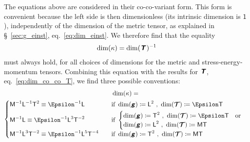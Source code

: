 \documentclass[\ifafour a4paper,12pt,\else a5paper,10pt,\fi%
onecolumn,oneside,article,%
british%
]{memoir}
\makeatletter
\theoremstyle{remark}
\theoremstyle{innote}
\newcommand*{\mathte}[1]{\textbf{\textit{\textsf{#1}}}}
\newcommand*{\defd}{\coloneqq}
\renewcommand*{\|}[1][]{\nonscript\,#1\vert\nonscript\;\mathopen{}}
\newcommand*{\sect}{\S}%
\newcommand*{\eqn}{eq.}%
\newcommand*{\q}{}%
\DeclareRobustCommand*{\q}{%
  \mathord{\mathpalette\bigcdot@{}}%
}
\newcommand*{\bigcdot@scalefactor}{0.7}
\newcommand*{\bigcdot@widthfactor}{1.5}
\newcommand*{\bigcdot@}[2]{%
  \sbox0{$#1\vcenter{}$}%
  \sbox2{$#1\cdot\m@th$}%
  \hbox to \bigcdot@widthfactor\wd2{%
    \hfil
    \raise\ht0\hbox{%
      \scalebox{\bigcdot@scalefactor}{%
        \lower\ht0\hbox{$#1\bullet\m@th$}%
      }%
    }%
    \hfil
  }%
}
\newcommand*{\Un}{\textsf{1}}
\newcommand*{\Le}{\textsf{L}}
\newcommand*{\Ti}{\textsf{T}}
\newcommand*{\Ma}{\textsf{M}}
\newcommand*{\En}{\Epsilon}%
\newcommand*{\yg}{\mathte{g}}
\newcommand*{\yT}{\bm{\mathcal{T}}}
\newcommand*{\yTe}{\mathte{T}}
\newcommand*{\yG}{\mathte{G}}
\renewcommand*{\i}{\indices}
\newcommand*{\yk}{\kappa}
\makeatother
\begin{document}
The equations above are considered in their co-co-variant form. This form
is convenient because the left side is then dimensionless (its intrinsic
dimension is $\Un$), independently of the dimension of the metric tensor,
as explained in \sect~\ref{sec:g_einst}, \eqn~\eqref{eq:dim_einst}. We
therefore find that the equality
\begin{equation}
  \label{eq:dim_k_general}
  \dim(\yk) = \dim(\yTe\i{_{\q\q}})^{-1} 
\end{equation}
must always hold, for all choices of dimensions for the metric and
stress-energy-momentum tensors. Combining this equation with the results
for $\yTe$, \eqn~\eqref{eq:dim_co_co_T}, we find three possible
conventions:
\begin{multline}
\label{eq:dim_k_choices}
\dim(\yk) ={}\\
  \begin{cases}
    \Ma^{-1}\Le^{-1}\Ti^{2} \equiv \En^{-1}\Le
&\quad\text{if}\ \dim(\yg)\defd \Le^2 \ ,\ \dim(\yT)\defd \En\Ti
    \\[\jot]
    \Ma^{-1}\Le \equiv \En^{-1}\Le^{3}\Ti^{-2}
 &\quad\text{if}\ 
 \begin{cases}
\dim(\yg)\defd \Ti^2 \ ,\ \dim(\yT)\defd \En\Ti 
    \quad\text{or}\\
\dim(\yg)\defd \Le^2 \ ,\ \dim(\yT)\defd \Ma\Ti 
 \end{cases}
    \\[2\jot]
    \Ma^{-1}\Le^{3}\Ti^{-2} \equiv \En^{-1}\Le^{5}\Ti^{-4}
     &\quad\text{if}\ 
\dim(\yg)\defd \Ti^2 \ ,\ \dim(\yT)\defd \Ma\Ti
  \end{cases}
\end{multline}
\end{document}
